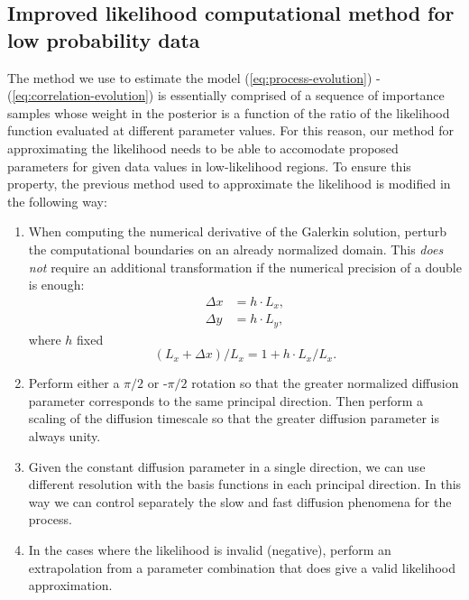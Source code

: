 \documentclass[10pt]{article}
\begin{document}
\subsection{Improved likelihood computational method for low probability data} \label{sec:improvements}
The method we use to estimate the model
(\ref{eq:process-evolution}) - (\ref{eq:correlation-evolution}) is
essentially comprised of a sequence of importance samples whose weight
in the posterior is a function of the ratio of the likelihood function
evaluated at different parameter values. For this reason, our method
for approximating the likelihood needs to be able to accomodate
proposed parameters for given data values in low-likelihood
regions. To ensure this property, the previous method used to
approximate the likelihood is modified in the following way:
\begin{enumerate}
\item When computing the numerical derivative of the Galerkin
  solution, perturb the computational boundaries on an already
  normalized domain. This \textit{does not} require an additional
  transformation if the numerical precision of a double is enough:
  \begin{align}
    \Delta x &= h \cdot L_x, \\
    \Delta y &= h \cdot L_y,
  \end{align}
  where $h$ fixed
  \[
    (L_x + \Delta x) / L_x = 1 + h\cdot L_x / L_x.
  \]

\item Perform either a $\pi/2$ or -$\pi/2$ rotation so that the
  greater normalized diffusion parameter corresponds to the same
  principal direction. Then perform a scaling of the diffusion
  timescale so that the greater diffusion parameter is always unity.

\item Given the constant diffusion parameter in a single direction, we
  can use different resolution with the basis functions in each
  principal direction. In this way we can control separately the slow
  and fast diffusion phenomena for the process.

\item In the cases where the likelihood is invalid (negative), perform
  an extrapolation from a parameter combination that does give a valid
  likelihood approximation.
\end{enumerate}
\end{document}
